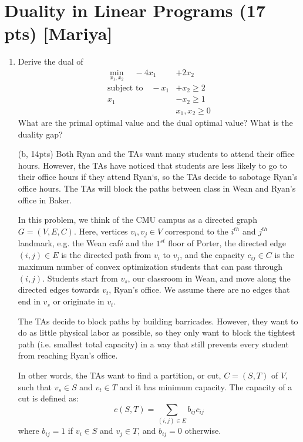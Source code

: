 \documentclass{article}
\theoremstyle{remark}
\theoremstyle{definition}
\newcommand{\subjectto}{\mbox{subject to}}
\begin{document}
\section{Duality in Linear Programs (17 pts) [Mariya]}
\begin{enumerate}[(a, 3pts)]
	\item Derive the dual of 
		\begin{align*}
		\min_{x_1,x_2} \quad - 4x_1 & + 2x_2 \\
		\subjectto \quad   - x_1 & + x_2 \geq 2 \\
				     x_1 & - x_2 \geq 1 \\
				     & x_1,x_2 \geq 0
		\end{align*}
		What are the primal optimal value and the dual optimal value? What is the duality gap?
	\item[(b, 14pts)] Both Ryan and the TAs want many students to attend their office hours. However, the TAs have noticed that students are less likely to go to their office hours if they attend Ryan`s, so the TAs decide to sabotage Ryan's office hours. The TAs will block the paths between class in Wean and Ryan's office in Baker. 
	
	\quad \quad In this problem, we think of the CMU campus as a directed graph $G = (V,E,C)$. Here, vertices $v_i,v_j\in V$ correspond to the $i^{th}$ and $j^{th}$ landmark, e.g. the Wean caf\'{e} and the $1^{st}$ floor of Porter, the directed edge $(i,j) \in E$ is the directed path from $v_i$ to $v_j$, and the capacity $c_{ij} \in C$ is the maximum number of convex optimization students that can pass through $(i,j)$. Students start from $v_s$, our classroom in Wean, and move along the directed edges towards $v_t$, Ryan's office. We assume there are no edges that end in $v_s$ or originate in $v_t$.
	
	\quad \quad The TAs decide to block paths by building barricades. However, they want to do as little physical labor as possible, so they only want to block the tightest path (i.e. smallest total capacity) in a way that still prevents every student from reaching Ryan's office.
	
	\quad \quad In other words, the TAs want to find a partition, or cut, $C = (S,T)$ of $V$, such that $v_s \in S$ and $v_t \in T$ and it has minimum capacity. The capacity of a cut is defined as:
	\begin{equation*}
	    c(S,T) = \sum_{(i,j)\in E}b_{ij}c_{ij}
	\end{equation*}
	where $b_{ij} = 1$ if $v_i \in S$ and $v_j \in T$, and $b_{ij} = 0$ otherwise.
	

\end{enumerate}
\end{document}
